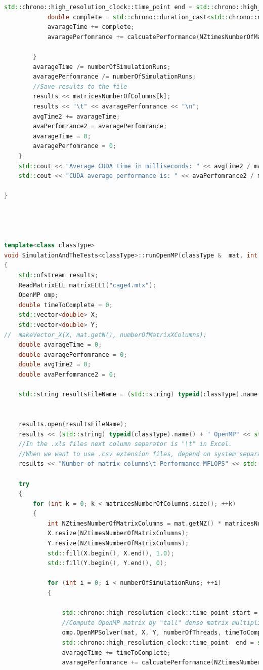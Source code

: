 \documentclass{scrreprt}
\begin{document}
\begin{lstlisting}[language=C++, caption=SimulationAndTheTests.cpp]
			std::chrono::high_resolution_clock::time_point end = std::chrono::high_resolution_clock::now();
			double complete = std::chrono::duration_cast<std::chrono::nanoseconds>(end - start).count() / 1000000.0;
			avarageTime += complete;
			avaragePerfomrance += calcuatePerformance(NZtimesNumberOfMatrixColumns, complete);

		}
		avarageTime /= numberOfSimulationRuns;
		avaragePerfomrance /= numberOfSimulationRuns;
		//Save results to the file
		results << matricesNumberOfColumns[k];
		results << "\t" << avaragePerfomrance << "\n";
		avgTime2 += avarageTime;
		avaPerfomrance2 = avaragePerfomrance;
		avarageTime = 0;
		avaragePerfomrance = 0;
	}
	std::cout << "Average CUDA time in milliseconds: " << avgTime2 / matricesNumberOfColumns.size() << " ms\n";
	std::cout << "CUDA average performance is: " << avaPerfomrance2 / matricesNumberOfColumns.size() << " MFLOPS\n" << std::endl;

}




template<class classType>
void SimulationAndTheTests<classType>::runOpenMP(classType &  mat, int numberOfThreads, int numberOfSimulationRuns)
{
	std::ofstream results;
	ReadMatrixELL matrixELL1("cage4.mtx");
	OpenMP omp;
	double timeToComplete = 0;
	std::vector<double> X;
	std::vector<double> Y;
//	makeVector_X(X, mat.getN(), numberOfMatrixXColumns);
	double avarageTime = 0;
	double avaragePerfomrance = 0;
	double avgTime2 = 0;
	double avaPerfomrance2 = 0;

	std::string resultsFileName = (std::string) typeid(classType).name() + "OpenMP" + mat.getMatrixName() + ".xls";
	

	results.open(resultsFileName); 
	results << (std::string) typeid(classType).name() + " OpenMP" << std::endl;
	//In the .xls files next column separator is "\t" in Excel. 
	//When we want to use .csv extension files, depend on system separator could be "," or ";" .
	results << "Number of matrix columns\t Performance MFLOPS" << std::endl;
	
	try
	{
		for (int k = 0; k < matricesNumberOfColumns.size(); ++k)
		{
			int NZtimesNumberOfMatrixColumns = mat.getNZ() * matricesNumberOfColumns[k];
			X.resize(NZtimesNumberOfMatrixColumns);
			Y.resize(NZtimesNumberOfMatrixColumns);
			std::fill(X.begin(), X.end(), 1.0);
			std::fill(Y.begin(), Y.end(), 0);

			for (int i = 0; i < numberOfSimulationRuns; ++i)
			{

				std::chrono::high_resolution_clock::time_point start = std::chrono::high_resolution_clock::now();
				//Compute OpenMP matrix by "tall" dense matrix multiplication product
				omp.OpenMPSolver(mat, X, Y, numberOfThreads, timeToComplete, matricesNumberOfColumns[k]);
				std::chrono::high_resolution_clock::time_point  end = std::chrono::high_resolution_clock::now();
				avarageTime += timeToComplete;
				avaragePerfomrance += calcuatePerformance(NZtimesNumberOfMatrixColumns, timeToComplete);


\end{lstlisting}
\end{document}
